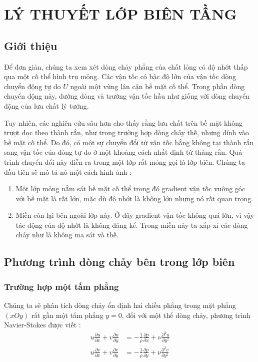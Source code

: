 \documentclass[THUY_DONG_HOC.tex]{subfiles}
\begin{document}
\chapter{LÝ THUYẾT LỚP BIÊN TẦNG}
\section{Giới thiệu}

Để đơn giản, chúng ta xem xét dòng chảy phẳng của chất lỏng có độ nhớt thấp
qua một cố thể hình trụ mỏng. Các vận tốc có bậc độ lớn của vận tốc dòng chuyển động tự do $U$ ngoài một vùng lân cận bề mặt cố thể. Trong phần dòng chuyển động này, đường dòng và trường vận tốc hầu như giống với dòng chuyển động của lưu chất lý tưởng.

Tuy nhiên, các nghiên cứu sâu hơn cho thấy rằng lưu chất trên bề mặt không trượt dọc theo thành rắn, như trong trường hợp dòng chảy thế, nhưng dính vào bề mặt cố thể. Do đó, có một sự chuyển đổi từ vận tốc bằng không tại thành rắn sang vận tốc của dòng tự do ở một khoảng cách nhất định từ thàng rắn. Quá trình chuyển đổi này diễn ra trong một lớp rất mỏng gọi là lớp biên. Chúng ta đầu tiên sẽ mô tả nó một cách hình ảnh :
\begin{enumerate}
	\item Một lớp mỏng nằm sát bề mặt cố thể trong đó gradient vận tốc vuông góc với bề mặt là rất lớn, mặc dù độ nhớt là không lớn nhưng nó rất quan trọng.
	\item Miền còn lại bên ngoài lớp này. Ở đây gradient vận tốc không quá lớn, vì vậy tác động của độ nhớt là không đáng kể. Trong miền này ta xấp xỉ các dòng chảy như là không ma sát và thế.
\end{enumerate}

\section{Phương trình dòng chảy bên trong lớp biên}
\subsection{Trường hợp một tấm phẳng}
Chúng ta sẽ phân tích dòng chảy ổn định hai chiều phẳng trong mặt phẳng $(xOy)$ rất gần một tấm phẳng $y=0$, đối với một thế dòng chảy, phương trình Navier-Stokes được viết :
\begin{equation}
	\begin{aligned}
		u\frac{{\partial u}}{{\partial x}} + v\frac{{\partial u}}{{\partial y}} &=  - \frac{1}{\rho }\frac{{\partial p}}{{\partial x}} + \nu \frac{{{\partial ^2}u}}{{\partial {y^2}}}\\
		u\frac{{\partial v}}{{\partial x}} + v\frac{{\partial v}}{{\partial y}} &=  - \frac{1}{\rho }\frac{{\partial p}}{{\partial y}} + \nu \frac{{{\partial ^2}v}}{{\partial {y^2}}}
	\end{aligned}
\end{equation}
\end{document}
